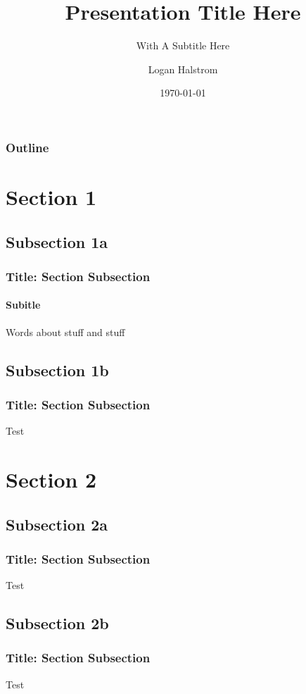 \documentclass{beamer}
\title{Presentation Title Here}
\subtitle{With A Subtitle Here}
\author{Logan Halstrom}
\institute{UCD + NASA}
\date{\today}
\begin{document}

\begin{frame}
\titlepage
\end{frame}


\begin{frame}
\frametitle{Outline}
\tableofcontents
\end{frame}



\section{Section 1}
\subsection{Subsection 1a}

\begin{frame}
\frametitle{Title: Section \thesection Subsection \thesubsection}
\framesubtitle{Subitle}
Words about stuff and stuff
\end{frame}

\subsection{Subsection 1b}
\begin{frame}
\frametitle{Title: Section \thesection Subsection \thesubsection}
Test
\end{frame}

\section{Section 2}

\subsection{Subsection 2a}
\begin{frame}
\frametitle{Title: Section \thesection Subsection \thesubsection}
Test
\end{frame}

\subsection{Subsection 2b}
\begin{frame}
\frametitle{Title: Section \thesection Subsection \thesubsection}
Test
\end{frame}
\end{document}
